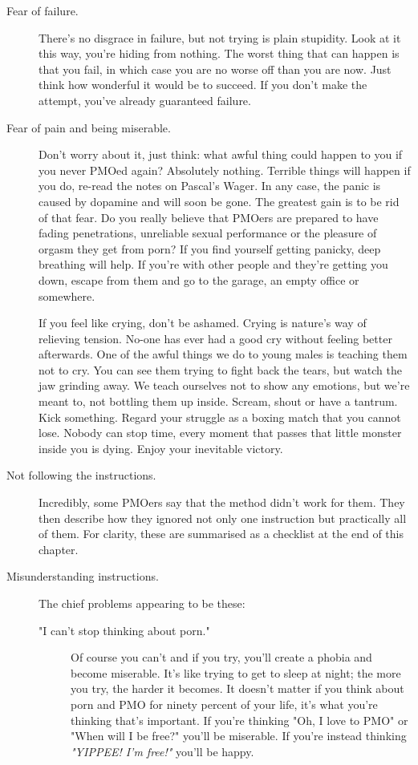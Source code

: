\documentclass[easypeasy.tex]{subfiles}
\begin{document}
\begin{description}
  \item [Fear of failure.] There's no disgrace in failure, but not trying is plain stupidity. Look at it this way, you're hiding from nothing. The worst thing that can happen is that you fail, in which case you are no worse off than you are now. Just think how wonderful it would be to succeed. If you don't make the attempt, you've already guaranteed failure.

  \item [Fear of pain and being miserable.] Don't worry about it, just think: what awful thing could happen to you if you never PMOed again? Absolutely nothing. Terrible things will happen if you do, re-read the notes on Pascal's Wager. In any case, the panic is caused by dopamine and will soon be gone. The greatest gain is to be rid of that fear. Do you really believe that PMOers are prepared to have fading penetrations, unreliable sexual performance or the pleasure of orgasm they get from porn? If you find yourself getting panicky, deep breathing will help. If you're with other people and they're getting you down, escape from them and go to the garage, an empty office or somewhere.

  If you feel like crying, don't be ashamed. Crying is nature's way of relieving tension. No-one has ever had a good cry without feeling better afterwards. One of the awful things we do to young males is teaching them not to cry. You can see them trying to fight back the tears, but watch the jaw grinding away. We teach ourselves not to show any emotions, but we're meant to, not bottling them up inside. Scream, shout or have a tantrum. Kick something. Regard your struggle as a boxing match that you cannot lose. Nobody can stop time, every moment that passes that little monster inside you is dying. Enjoy your inevitable victory. 

  \item [Not following the instructions.] Incredibly, some PMOers say that the method didn't work for them. They then describe how they ignored not only one instruction but practically all of them. For clarity, these are summarised as a checklist at the end of this chapter.

  \item [Misunderstanding instructions.] The chief problems appearing to be these:

    \begin{description} 
    \item["I can't stop thinking about porn."]
      Of course you can't and if you try, you'll create a phobia and become miserable. It's like trying to get to sleep at night; the more you try, the harder it becomes. It doesn't matter if you think about porn and PMO for ninety percent of your life, it's what you're thinking that's important. If you're thinking "Oh, I love to PMO" or "When will I be free?" you'll be miserable. If you're instead thinking \textit{"YIPPEE! I'm free!"} you'll be happy.


\end{description}
\end{description}
\end{document}
